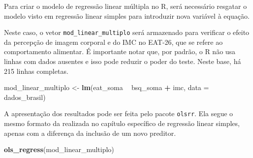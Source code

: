 \documentclass[
]{book}
\newenvironment{Shaded}{\begin{snugshade}}{\end{snugshade}}
\newcommand{\DataTypeTok}[1]{\textcolor[rgb]{0.13,0.29,0.53}{#1}}
\newcommand{\KeywordTok}[1]{\textcolor[rgb]{0.13,0.29,0.53}{\textbf{#1}}}
\newcommand{\NormalTok}[1]{#1}
\newcommand{\OperatorTok}[1]{\textcolor[rgb]{0.81,0.36,0.00}{\textbf{#1}}}
\newcommand{\StringTok}[1]{\textcolor[rgb]{0.31,0.60,0.02}{#1}}
\begin{document}
Para criar o modelo de regressão linear múltipla no R, será necessário
resgatar o modelo visto em regressão linear simples para introduzir nova
variável à equação.

Neste caso, o vetor \texttt{mod\_linear\_multiplo} será armazenado para
verificar o efeito da percepção de imagem corporal e do IMC no EAT-26,
que se refere ao comportamento alimentar. É importante notar que, por
padrão, o R não usa linhas com dados ausentes e isso pode reduzir o
poder do teste. Neste base, há 215 linhas completas.

\begin{Shaded}
\begin{Highlighting}[]
\NormalTok{mod_linear_multiplo <-}\StringTok{ }\KeywordTok{lm}\NormalTok{(eat_soma }\OperatorTok{~}\StringTok{ }\NormalTok{bsq_soma }\OperatorTok{+}\StringTok{ }\NormalTok{imc, }\DataTypeTok{data =}\NormalTok{ dados_brasil)}
\end{Highlighting}
\end{Shaded}

A apresentação dos resultados pode ser feita pelo pacote \texttt{olsrr}.
Ela segue o mesmo formato da realizada no capítulo específico de
regressão linear simples, apenas com a diferença da inclusão de um novo
preditor.

\begin{Shaded}
\begin{Highlighting}[]
\KeywordTok{ols_regress}\NormalTok{(mod_linear_multiplo)}
\end{Highlighting}
\end{Shaded}
\end{document}
